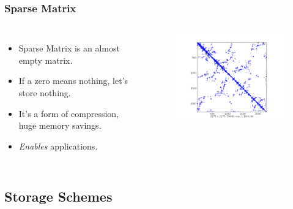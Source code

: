 \documentclass[10pt,colorlinks]{beamer}
\begin{document}
\begin{frame}[fragile]\frametitle{Sparse Matrix}
 \begin{columns}[c]
        \begin{itemize}
            \item Sparse Matrix is an almost empty matrix.
            \item If a zero means nothing, let's store nothing.
            \item It's a form of compression, huge memory savings.
            \item \emph{Enables} applications.
         \end{itemize}
      \begin{figure}[!htb]
        \centering
        \includegraphics[width=\textwidth]{figs/graph_g}
      \end{figure}
  \end{columns}
\end{frame}
 
\subsection{Storage Schemes} %
\label{ssub:Storage Scheme}
\end{document}
